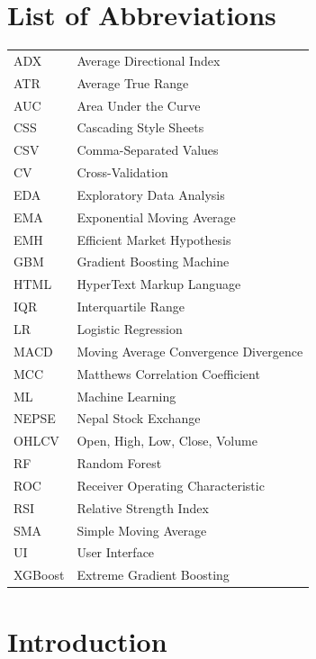\documentclass[12pt, a4paper]{report}
\begin{document}
	\chapter*{List of Abbreviations}
	
	\begin{tabular}{ll}
		ADX & Average Directional Index \\
		ATR & Average True Range \\
		AUC & Area Under the Curve \\
		CSS & Cascading Style Sheets \\
		CSV & Comma-Separated Values \\
		CV & Cross-Validation \\
		EDA & Exploratory Data Analysis \\
		EMA & Exponential Moving Average \\
		EMH & Efficient Market Hypothesis \\
		GBM & Gradient Boosting Machine \\
		HTML & HyperText Markup Language \\
		IQR & Interquartile Range \\
		LR & Logistic Regression \\
		MACD & Moving Average Convergence Divergence \\
		MCC & Matthews Correlation Coefficient \\
		ML & Machine Learning \\
		NEPSE & Nepal Stock Exchange \\
		OHLCV & Open, High, Low, Close, Volume \\
		RF & Random Forest \\
		ROC & Receiver Operating Characteristic \\
		RSI & Relative Strength Index \\
		SMA & Simple Moving Average \\
		UI & User Interface \\
		XGBoost & Extreme Gradient Boosting \\
	\end{tabular}
	\newpage
	\setcounter{page}{1}
	\chapter{Introduction}
	
\end{document}
